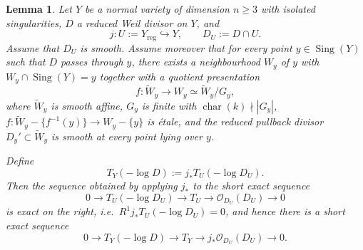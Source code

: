 \documentclass[12pt,twoside,]{amsart}
\theoremstyle{plain}
\newtheorem{lemma}[theorem]{Lemma}
\theoremstyle{definition}
\begin{document}
\begin{lemma}\label{lem:log_tangent_exact_sequence_isolated_quotient}
Let $Y$ be a normal variety of dimension $n \geq 3$ with isolated singularities,
$D$ a reduced Weil divisor on $Y$, and
\[
j:U:=Y_{\mathrm{reg}}\hookrightarrow Y,
\qquad
D_U:=D\cap U.
\]
Assume that $D_U$ is smooth. Assume moreover that for every point
$y\in \operatorname{Sing}(Y)$ such that $D$ passes through $y$, there exists a
neighbourhood $W_y$ of $y$ with $W_y \cap \operatorname{Sing}(Y) = y$ together with a
quotient presentation
\[
f: \widetilde{W}_y \to W_y \simeq \widetilde{W}_y/G_y,
\]
where $\widetilde{W}_y$ is smooth affine, $G_y$ is finite with
$\operatorname{char}(k)\nmid |G_y|$,
$f: \widetilde{W}_y- \{f^{-1}(y)\} \to W_y- \{y\}$ is \'etale,
and the reduced pullback divisor
$D_y'\subset \widetilde{W}_y$ is smooth at every point lying over $y$.

Define
\[
T_Y(-\log D):=j_*T_U(-\log D_U).
\]
Then the sequence obtained by applying $j_*$ to the short exact sequence
\[
0\longrightarrow T_U(-\log D_U)
\longrightarrow T_U
\longrightarrow \mathcal O_{D_U}(D_U)
\longrightarrow 0
\]
is exact on the right, i.e.\ $R^1j_*T_U(-\log D_U)=0$,
and hence there is a short exact sequence
\[
0\longrightarrow T_Y(-\log D)
\longrightarrow T_Y
\longrightarrow j_*\mathcal O_{D_U}(D_U)
\longrightarrow 0.
\]
\end{lemma}
\end{document}
